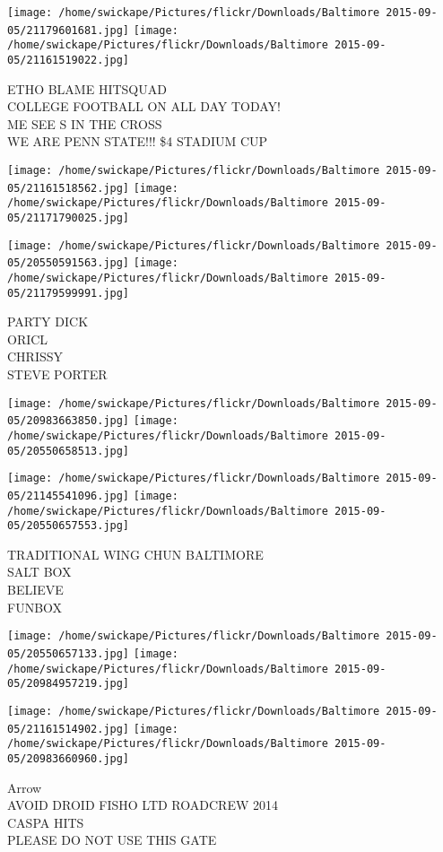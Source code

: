 \documentclass[10pt,letterpaper]{article}
\begin{document}
\texttt{[image: /home/swickape/Pictures/flickr/Downloads/Baltimore 2015-09-05/21179601681.jpg]}
\texttt{[image: /home/swickape/Pictures/flickr/Downloads/Baltimore 2015-09-05/21161519022.jpg]}

ETHO BLAME HITSQUAD\\
COLLEGE FOOTBALL ON ALL DAY TODAY!\\
ME SEE S IN THE CROSS\\
WE ARE PENN STATE!!! \$4 STADIUM CUP
\pagebreak

\texttt{[image: /home/swickape/Pictures/flickr/Downloads/Baltimore 2015-09-05/21161518562.jpg]}
\texttt{[image: /home/swickape/Pictures/flickr/Downloads/Baltimore 2015-09-05/21171790025.jpg]}

\texttt{[image: /home/swickape/Pictures/flickr/Downloads/Baltimore 2015-09-05/20550591563.jpg]}
\texttt{[image: /home/swickape/Pictures/flickr/Downloads/Baltimore 2015-09-05/21179599991.jpg]}

PARTY DICK\\
ORICL\\
CHRISSY\\
STEVE PORTER
\pagebreak

\texttt{[image: /home/swickape/Pictures/flickr/Downloads/Baltimore 2015-09-05/20983663850.jpg]}
\texttt{[image: /home/swickape/Pictures/flickr/Downloads/Baltimore 2015-09-05/20550658513.jpg]}

\texttt{[image: /home/swickape/Pictures/flickr/Downloads/Baltimore 2015-09-05/21145541096.jpg]}
\texttt{[image: /home/swickape/Pictures/flickr/Downloads/Baltimore 2015-09-05/20550657553.jpg]}

TRADITIONAL WING CHUN BALTIMORE\\
SALT BOX\\
BELIEVE\\
FUNBOX
\pagebreak

\texttt{[image: /home/swickape/Pictures/flickr/Downloads/Baltimore 2015-09-05/20550657133.jpg]}
\texttt{[image: /home/swickape/Pictures/flickr/Downloads/Baltimore 2015-09-05/20984957219.jpg]}

\texttt{[image: /home/swickape/Pictures/flickr/Downloads/Baltimore 2015-09-05/21161514902.jpg]}
\texttt{[image: /home/swickape/Pictures/flickr/Downloads/Baltimore 2015-09-05/20983660960.jpg]}

Arrow\\
AVOID DROID FISHO LTD ROADCREW 2014\\
CASPA HITS\\
PLEASE DO NOT USE THIS GATE
\pagebreak
\end{document}
